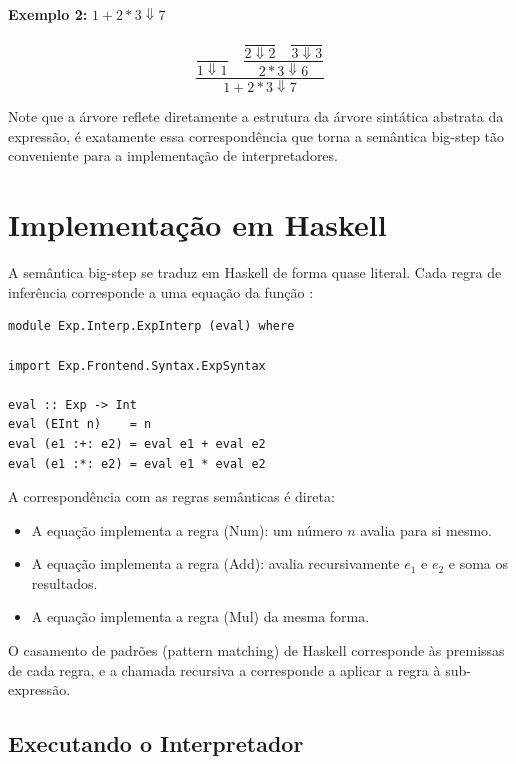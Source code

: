 \textbf{Exemplo 2:} \(1 + 2 * 3 \Downarrow 7\)

\[
  \dfrac{
    \dfrac{}{1 \Downarrow 1}
    \quad
    \dfrac{
      \dfrac{}{2 \Downarrow 2} \quad \dfrac{}{3 \Downarrow 3}
    }{2 * 3 \Downarrow 6}
  }{1 + 2 * 3 \Downarrow 7}
\]

Note que a árvore reflete diretamente a estrutura da árvore sintática
abstrata da expressão, é exatamente essa correspondência que torna
a semântica big-step tão conveniente para a implementação de interpretadores.

\section{Implementação em Haskell}

A semântica big-step se traduz em Haskell de forma quase literal.
Cada regra de inferência corresponde a uma equação da função
:

\begin{verbatim}
module Exp.Interp.ExpInterp (eval) where

import Exp.Frontend.Syntax.ExpSyntax

eval :: Exp -> Int
eval (EInt n)    = n
eval (e1 :+: e2) = eval e1 + eval e2
eval (e1 :*: e2) = eval e1 * eval e2
\end{verbatim}

A correspondência com as regras semânticas é direta:

\begin{itemize}
  \item A equação  implementa
    a regra (Num): um número \(n\) avalia para si mesmo.
  \item A equação  implementa
    a regra (Add): avalia recursivamente \(e_1\)
    e \(e_2\) e soma os resultados.
  \item A equação  implementa
    a regra (Mul) da mesma forma.
\end{itemize}

O casamento de padrões (pattern matching) de Haskell corresponde às
premissas de cada regra, e a chamada recursiva a
 corresponde a aplicar a regra à sub-expressão.

\subsection{Executando o Interpretador}

